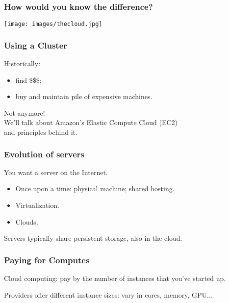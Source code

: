 \begin{frame}
\frametitle{How would you know the difference?}
\begin{center}
	\texttt{[image: images/thecloud.jpg]}
\end{center}
\end{frame}

\begin{frame}
  \frametitle{Using a Cluster}

  
    Historically:
\begin{itemize}
  \item find \$\$\$;
  \item buy and maintain pile of expensive machines.
\end{itemize}

  Not anymore! \\[1em]

  We'll talk about Amazon's Elastic Compute Cloud (EC2)\\ and
  principles behind it.
  
\end{frame}

\begin{frame}
  \frametitle{Evolution of servers}

  

You want a server on the Internet.
\begin{itemize}
\item 
  Once upon a time: physical machine; shared hosting.
\item Virtualization.
\item Clouds.
\end{itemize}

  Servers typically share persistent storage, also in
  the cloud. 

  
\end{frame}

\begin{frame}
  \frametitle{Paying for Computes}

  
Cloud computing: pay by the number of
instances that you've started up.


Providers offer different instance sizes: vary in cores, memory, GPU...

  
\end{frame}


